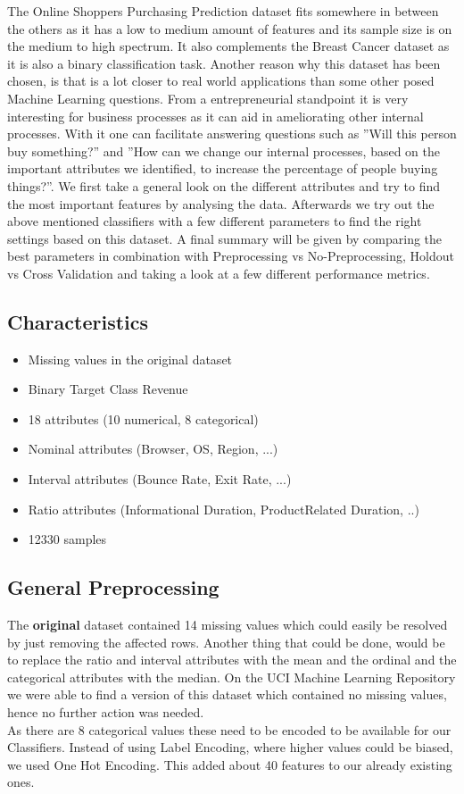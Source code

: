 

The Online Shoppers Purchasing Prediction dataset fits somewhere in between the others as it has a low to medium amount of features and its sample size is on the medium to high spectrum. It also complements the Breast Cancer dataset as it is also a binary classification task. Another reason why  this dataset has been chosen, is that is a lot closer to real world applications than some other posed Machine Learning questions. From a entrepreneurial standpoint it is very interesting for business processes as it can aid in ameliorating other internal processes. With it one can facilitate answering questions such as ''Will this person buy something?'' and ''How can we change our internal processes, based on the important attributes we identified, to increase the percentage of people buying things?''. We first take a general look on the different attributes and try to find the most important features by analysing the data. Afterwards we try out the above mentioned classifiers with a few different parameters to find the right settings based on this dataset. A final summary will be given by comparing the best parameters in combination with Preprocessing vs No-Preprocessing, Holdout vs Cross Validation and taking a look at a few different performance metrics. 

\subsection{Characteristics}

\begin{itemize}
\item Missing values in the original dataset
\item Binary Target Class Revenue
\item 18 attributes (10 numerical, 8 categorical)
\item Nominal attributes (Browser, OS, Region, ...)
\item Interval attributes (Bounce Rate, Exit Rate, ...)
\item Ratio attributes (Informational Duration, ProductRelated Duration, ..)
\item 12330 samples
\end{itemize}

\subsection{General Preprocessing} \label{GenPrepro}
The \textbf{original} dataset contained 14 missing values which could easily be resolved by just removing the affected rows. Another thing that could be done, would be to replace the ratio and interval attributes with the mean and the ordinal and the categorical attributes with the median. On the UCI Machine Learning Repository we were able to find a version of this dataset which contained no missing values, hence no further action was needed. \\
\newline
As there are 8 categorical values these need to be encoded to be available for our Classifiers. Instead of using Label Encoding, where higher values could be biased, we used One Hot Encoding. This added about 40 features to our already existing ones.

